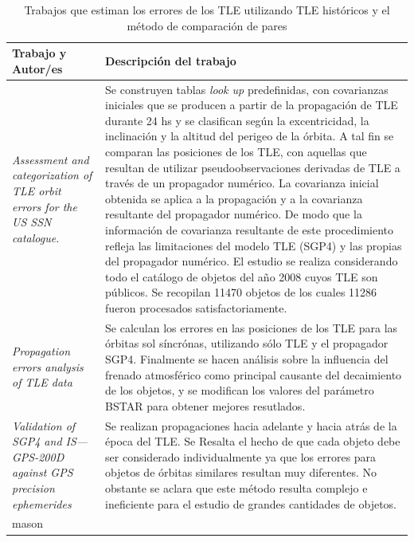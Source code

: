\begin{table}
\caption[Estimaciones con TLE]{Trabajos que estiman los errores de los TLE utilizando TLE hist\'oricos y el m\'etodo de comparaci\'on de pares}
  \begin{tabular}{p{5cm}p{12cm}}
  \hline \hline
  Trabajo y Autor/es & Descripci\'on del trabajo \\
  \hline \hline
   {\it{Assessment and categorization of TLE orbit errors for the US SSN catalogue.}}  \citep{krag2007assessment} & Se construyen tablas {\it{look up}} predefinidas, con covarianzas iniciales que se producen a partir de la propagación de TLE durante 24 hs y se clasifican seg\'un la excentricidad, la inclinaci\'on y la altitud del perigeo de la \'orbita. A tal fin se comparan las posiciones de los TLE, con aquellas que resultan de utilizar pseudo\-observaciones derivadas de TLE a trav\'es de un propagador num\'erico. La covarianza inicial obtenida se aplica a la propagaci\'on y a la covarianza resultante del propagador num\'erico. De modo que la informaci\'on de covarianza resultante de este procedimiento refleja las limitaciones del modelo TLE (SGP4) y las propias del propagador num\'erico. El estudio se realiza considerando todo el cat\'alogo de objetos del a\~no 2008 cuyos TLE son p\'ublicos. Se recopilan 11470 objetos de los cuales 11286 fueron procesados satisfactoriamente.\\
  \hline
  {\it{Propagation errors analysis of TLE data}} \citep{wang2009propagation} & Se calculan los errores en las posiciones de los TLE para las \'orbitas sol s\'incr\'onas, utilizando s\'olo TLE y el propagador SGP4. Finalmente se hacen an\'alisis sobre la influencia del frenado atmosf\'erico como principal causante del decaimiento de los objetos, y se modifican los valores del par\'ametro BSTAR para obtener mejores resutlados.\\
  \hline
  {\it{Validation of SGP4 and IS—GPS-200D against GPS precision ephemerides}} \citep{kelso2007validation} & Se realizan propagaciones hacia adelante y hacia atr\'as de la \'epoca del TLE. Se Resalta el hecho de que cada objeto debe ser considerado individualmente ya que los errores para objetos de \'orbitas similares resultan muy diferentes. No obstante se aclara que este m\'etodo resulta complejo e ineficiente para el estudio de grandes cantidades de objetos.\\
  \hline
  mason &\\
  \hline
  \end{tabular}
  \label{tab:trabajosprecisas}
\end{table}


